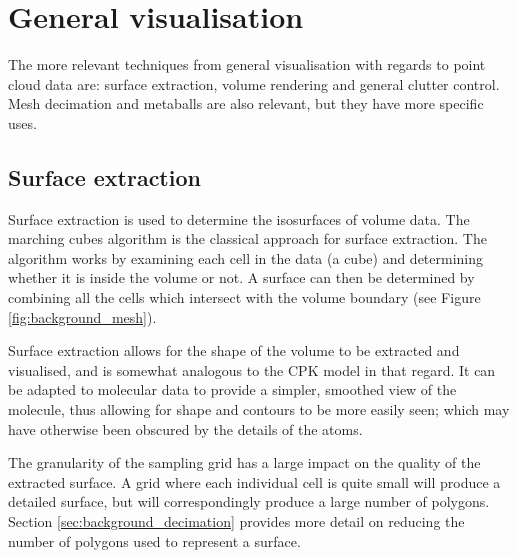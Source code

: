 

\section{General visualisation}
\label{sec:background_general}


The more relevant techniques from general visualisation with regards to point
cloud data are: surface extraction, volume rendering and general clutter
control. Mesh decimation and metaballs are also relevant, but they have more
specific uses.


\subsection{Surface extraction}
\label{sub:background_surface}


Surface extraction is used to determine the isosurfaces of volume data. The
marching cubes algorithm \citep{lorensen87} is the classical approach for
surface extraction. The algorithm works by examining each cell in the data (a
cube) and determining whether it is inside the volume or not. A surface can
then be determined by combining all the cells which intersect with the volume
boundary (see Figure \ref{fig:background_mesh}).

Surface extraction allows for the shape of the volume to be extracted and
visualised, and is somewhat analogous to the CPK model in that regard. It can
be adapted to molecular data to provide a simpler, smoothed view of the
molecule, thus allowing for shape and contours to be more easily seen; which
may have otherwise been obscured by the details of the atoms.

The granularity of the sampling grid has a large impact on the quality of the
extracted surface. A grid where each individual cell is quite small will
produce a detailed surface, but will correspondingly produce a large number of
polygons. Section \ref{sec:background_decimation} provides more detail on
reducing the number of polygons used to represent a surface.

